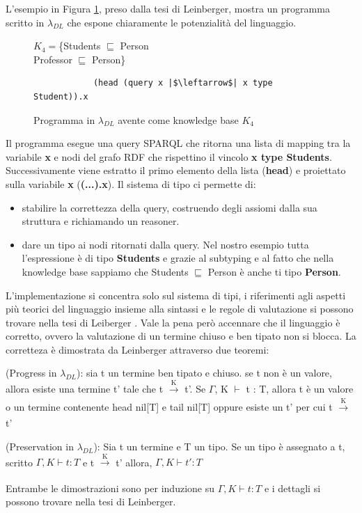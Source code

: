     L'esempio in Figura \ref{lambdaDLex}, preso dalla tesi di Leinberger, mostra un programma scritto in $\lambda_{DL}$ che espone chiaramente le potenzialità del linguaggio.
    \begin{figure}[h]
        \captionsetup{singlelinecheck = false}
        $K_4 = $\{Students $\sqsubseteq$ Person
        \\Professor $\sqsubseteq$ Person\}
        \begin{verbatim}
            (head (query x |$\leftarrow$| x type Student)).x
        \end{verbatim}
        \caption{Programma in $\lambda_{DL}$ avente come knowledge base $K_4$}
        \label{lambdaDLex}
    \end{figure}
   
   Il programma esegue una query SPARQL che ritorna una lista di mapping tra la variabile \textbf{x} e nodi del grafo RDF che rispettino il vincolo
    \textbf{x type Students}. Successivamente viene estratto il primo elemento della lista (\textbf{head}) e proiettato sulla variabile \textbf{x} (\textbf{(...).x}).
    Il sistema di tipo ci permette di:
    \begin{itemize}
        \item stabilire la correttezza della query, costruendo degli assiomi dalla sua struttura e richiamando un reasoner.
        \item dare un tipo ai nodi ritornati dalla query. Nel nostro esempio tutta l'espressione è di tipo \textbf{Students} e grazie al subtyping e al fatto
            che nella knowledge base sappiamo che Students $\sqsubseteq$ Person è anche ti tipo \textbf{Person}.
    \end{itemize}
    L'implementazione si concentra solo sul sistema di tipi, i riferimenti agli aspetti più teorici del linguaggio insieme alla sintassi e le regole di valutazione
    si possono trovare nella tesi di Leiberger \cite{leinbergerphdthesis}.
    Vale la pena per\`o accennare che il linguaggio è corretto, ovvero la valutazione di un termine chiuso e ben tipato non si blocca.
    La corretteza è dimostrata da Leinberger attraverso due teoremi:
    \begin{theorem}
        (Progress in $\lambda_{DL}$): sia t un termine ben tipato e chiuso. se t non è un valore, allora esiste una termine t' tale che
        t $\xrightarrow[]{\text{K}}$ t'. Se $\Gamma$, K $\vdash$ t : T, allora t è un valore o un termine contenente head nil[T] e tail nil[T] oppure esiste
        un t' per cui t $\xrightarrow[]{\text{K}}$ t'
    \end{theorem}
    \begin{theorem}
        (Preservation in $\lambda_{DL}$): Sia t un termine e T un tipo. Se un tipo è assegnato a t, scritto $\Gamma,K \vdash t : T$ e t $\xrightarrow[]{\text{K}}$ t'
        allora, $\Gamma,K \vdash t' : T$
    \end{theorem}
    Entrambe le dimostrazioni sono per induzione su $\Gamma,K \vdash t : T$ e i dettagli si possono trovare nella tesi di Leinberger.

